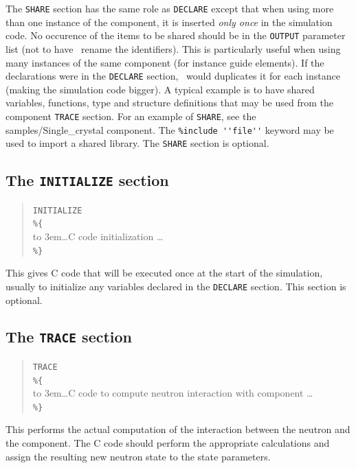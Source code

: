The \texttt{SHARE} section has the same role as \texttt{DECLARE} except that when using more than one instance of the component, it is inserted \emph{only once} in the simulation code. No occurence of the items to be shared should be in the \texttt{OUTPUT} parameter list (not to have \MCS\ rename the identifiers). 
This is particularly useful when using many instances of the same component (for instance guide elements). If the declarations were in the \texttt{DECLARE} section, \MCS\ would duplicates it for each instance (making the simulation code bigger).
A typical example is to have shared variables, functions, type and structure definitions that may be used from the component \texttt{TRACE} section. For an
example of \texttt{SHARE}, see the samples/Single\_crystal
component. The \verb+%include ''file''+ keyword may be used to import
a shared library. The \texttt{SHARE} section is optional.

\subsection{The \texttt{INITIALIZE} section}
\label{s:comp-initialize}

\begin{quote}
  \texttt{INITIALIZE} \\
  \verb|%{| \\
  \hbox to 3em{}\ldots C code initialization \ldots \\
  \verb|%}|
\end{quote}
This gives C code that will be executed once at the start of the
simulation, usually to initialize any variables declared in the
\texttt{DECLARE} section. This section is optional.


\subsection{The \texttt{TRACE} section}
\label{s:comp-trace}

\begin{quote}
  \texttt{TRACE} \\
  \verb|%{| \\
  \hbox to 3em{}\ldots C code to compute neutron interaction with
    component \ldots \\
  \verb|%}|
\end{quote}
This performs the actual computation of the interaction between the neutron
and the component. The C code should perform the appropriate
calculations and assign the resulting new neutron state to the state
parameters.


